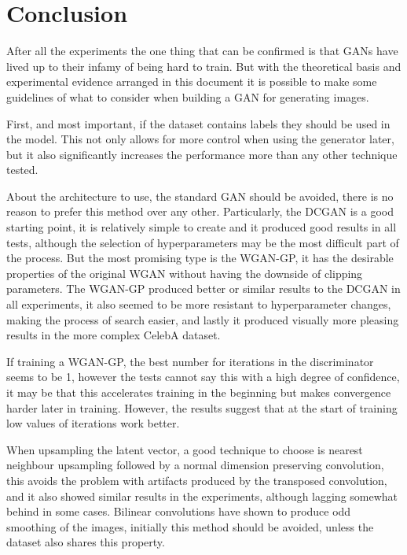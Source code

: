 \chapter{Conclusion} \label{cha:conclusion}
After all the experiments the one thing that can be confirmed is that \acp{GAN} have lived up to their infamy of being hard to train. But with the theoretical basis and experimental evidence arranged in this document it is possible to make some guidelines of what to consider when building a \gls{GAN} for generating images.

First, and most important, if the dataset contains labels they should be used in the model. This not only allows for more control when using the generator later, but it also significantly increases the performance more than any other technique tested.

About the architecture to use, the standard \gls{GAN} should be avoided, there is no reason to prefer this method over any other. Particularly, the \gls{DCGAN} is a good starting point, it is relatively simple to create and it produced good results in all tests, although the selection of hyperparameters may be the most difficult part of the process. But the most promising type is the \gls{WGAN-GP}, it has the desirable properties of the original \gls{WGAN} without having the downside of clipping parameters. The \gls{WGAN-GP} produced better or similar results to the \gls{DCGAN} in all experiments, it also seemed to be more resistant to hyperparameter changes, making the process of search easier, and lastly it produced visually more pleasing results in the more complex CelebA dataset.

If training a \gls{WGAN-GP}, the best number for iterations in the discriminator seems to be 1, however the tests cannot say this with a high degree of confidence, it may be that this accelerates training in the beginning but makes convergence harder later in training. However, the results suggest that at the start of training low values of iterations work better.

When upsampling the latent vector, a good technique to choose is nearest neighbour upsampling followed by a normal dimension preserving convolution, this avoids the problem with artifacts produced by the transposed convolution, and it also showed similar results in the experiments, although lagging somewhat behind in some cases. Bilinear convolutions have shown to produce odd smoothing of the images, initially this method should be avoided, unless the dataset also shares this property.

